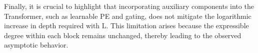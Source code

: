 Finally, it is crucial to highlight that incorporating auxiliary components into the Transformer, such as learnable PE and gating, does not mitigate the logarithmic increase in depth required with L. This limitation arises because the expressible degree within each block remains unchanged, thereby leading to the observed asymptotic behavior.

